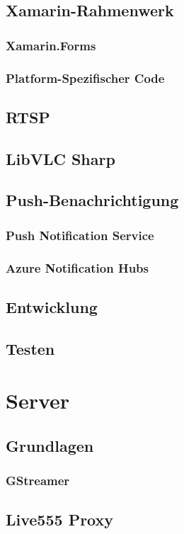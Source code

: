 \documentclass[a4paper, 12pt, twoside, openright
]{memoir}
\begin{document}
\chapter{Xamarin-Rahmenwerk}

\section{Xamarin.Forms}
\section{Platform-Spezifischer Code}
\chapter{RTSP}
\chapter{LibVLC Sharp}
\chapter{Push-Benachrichtigung}
\section{Push Notification Service}
\section{Azure Notification Hubs}
\chapter{Entwicklung}
\chapter{Testen}

\part{Server}
\chapter{Grundlagen}
\section{GStreamer}
\chapter{Live555 Proxy}
\end{document}
